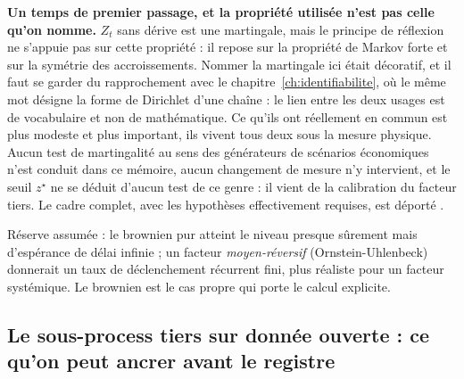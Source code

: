 \begin{cle}
\textbf{Un temps de premier passage, et la propriété utilisée n'est pas celle qu'on nomme.}
$Z_t$ sans dérive est une martingale, mais le principe de réflexion ne s'appuie pas sur cette
propriété : il repose sur la propriété de Markov forte et sur la symétrie des
accroissements. Nommer la martingale ici était décoratif, et il faut se garder du rapprochement
avec le chapitre~\ref{ch:identifiabilite}, où le même mot désigne la forme de Dirichlet d'une
chaîne : le lien entre les deux usages est de vocabulaire et non de mathématique. Ce
qu'ils ont réellement en commun est plus modeste et plus important, ils vivent tous deux sous la
mesure physique. Aucun test de martingalité au sens des générateurs de scénarios
économiques n'est conduit dans ce mémoire, aucun changement de mesure n'y intervient, et le
seuil $z^\star$ ne se déduit d'aucun test de ce genre : il vient de la calibration du facteur
tiers. Le cadre complet, avec les hypothèses effectivement requises, est déporté
\matcomp.

Réserve assumée : le brownien pur atteint le niveau presque sûrement mais d'espérance de délai
infinie ; un facteur \emph{moyen-réversif} (Ornstein-Uhlenbeck) donnerait un taux de
déclenchement récurrent fini, plus réaliste pour un facteur systémique. Le brownien est le cas
propre qui porte le calcul explicite.
\end{cle}

\subsection{Le sous-process tiers sur donnée ouverte : ce qu'on peut ancrer avant le registre}
\label{sec:p4-sousprocess}

